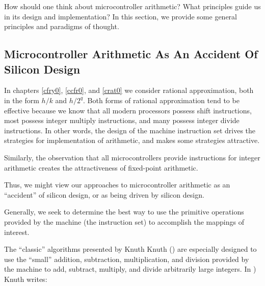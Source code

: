 How should one think about microcontroller arithmetic?  What principles
guide us in its design and implementation?  In this section,
we provide some general principles and paradigms of thought.


\subsection{Microcontroller Arithmetic As An Accident Of Silicon Design}
\label{ccil0:sppm0:smas0}

In chapters
\cfryzeroxrefhyphen{}\ref{cfry0},
\ccfrzeroxrefhyphen{}\ref{ccfr0},
and 
\cratzeroxrefhyphen{}\ref{crat0} 
we consider rational approximation,
both in the form $h/k$ and $h/2^q$.  Both forms of rational approximation
tend to be effective because we know that all modern processors possess
shift instructions, most possess integer multiply instructions, and many 
possess integer divide instructions.  In other words, the design
of the machine instruction set drives the strategies for implementation
of arithmetic, and makes some strategies attractive.

Similarly, the observation that all microcontrollers provide instructions
for integer arithmetic creates the attractiveness of fixed-point arithmetic.

Thus, we might view our approaches to microcontroller arithmetic as 
an ``accident'' of silicon design, or as being driven by silicon
design.

Generally, we seek to determine the best way to use the primitive
operations provided by the machine (the instruction set) to 
accomplish the mappings of interest.

The ``classic'' algorithms 
presented by Knuth 
Knuth (\cite[pp. 265-284]{bibref:b:knuthclassic2ndedvol2}) are especially
designed to use the ``small'' addition, subtraction, multiplication, and
division provided by the machine to add, subtract, multiply, and divide arbitrarily
large integers.  In 
\cite[pp. 265-266]{bibref:b:knuthclassic2ndedvol2}) Knuth writes:


